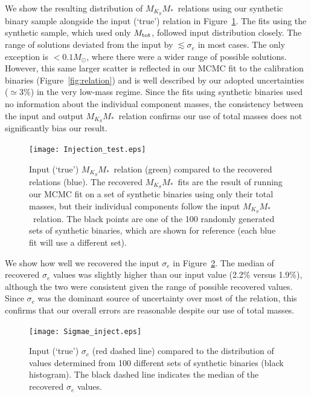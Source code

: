 \documentclass[twocolumn]{aastex62}
\newcommand{\mmk}{$M_{K_S}$\textendash$M_*$}
\newcommand{\mtot}{$M_{\rm{tot}}$}
\begin{document}
We show the resulting distribution of \mmk\ relations using our synthetic binary sample alongside the input (`true') relation in Figure~\ref{fig:inject}. The fits using the synthetic sample, which used only \mtot, followed input distribution closely. The range of solutions deviated from the input by $\lesssim \sigma_e$ in most cases. The only exception is $<0.1M_\odot$, where there were a wider range of possible solutions. However, this same larger scatter is reflected in our MCMC fit to the calibration binaries (Figure~\ref{fig:relation}) and is well described by our adopted uncertainties ($\simeq3\%$) in the very low-mass regime. Since the fits using synthetic binaries used no information about the individual component masses, the consistency between the input and output \mmk\ relation confirms our use of total masses does not significantly bias our result.

\begin{figure}[h]
\begin{center}
\texttt{[image: Injection\_test.eps]}
\caption{Input (`true') \mmk\ relation (green) compared to the recovered relations (blue). The recovered \mmk\ fits are the result of running our MCMC fit on a set of synthetic binaries using only their total masses, but their individual components follow the input \mmk\ relation. The black points are one of the 100 randomly generated sets of synthetic binaries, which are shown for reference (each blue fit will use a different set). }
\label{fig:inject}
\end{center}
\end{figure}

We show how well we recovered the input $\sigma_e$ in Figure~\ref{fig:sigetest}. The median of recovered $\sigma_e$ values was slightly higher than our input value (2.2\% versus 1.9\%), although the two were consistent given the range of possible recovered values. Since $\sigma_e$ was the dominant source of uncertainty over most of the relation, this confirms that our overall errors are reasonable despite our use of total masses. 

\begin{figure}[h]
\begin{center}
\texttt{[image: Sigmae\_inject.eps]}
\caption{Input (`true') $\sigma_e$ (red dashed line) compared to the distribution of values determined from 100 different sets of synthetic binaries (black histogram). The black dashed line indicates the median of the recovered $\sigma_e$ values. }
\label{fig:sigetest}
\end{center}
\end{figure}
\end{document}
